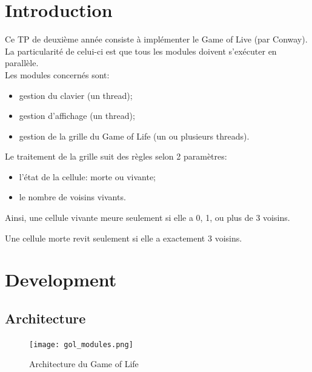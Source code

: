 \documentclass[11pt, a4paper]{article}
\begin{document}
\thispagestyle{empty}

\newpage

\section{Introduction}

Ce TP de deuxième année consiste à implémenter le Game of Live (par Conway).
La particularité de celui-ci est que tous les modules doivent s'exécuter en parallèle. \\

Les modules concernés sont:

\begin{itemize}
    \item gestion du clavier (un thread);
    \item gestion d'affichage (un thread);
    \item gestion de la grille du Game of Life (un ou plusieurs threads). \\
\end{itemize}

Le traitement de la grille suit des règles selon 2 paramètres:

\begin{itemize}
    \item l'état de la cellule: morte ou vivante;
    \item le nombre de voisins vivants. \\
\end{itemize}

Ainsi, une cellule vivante meure seulement si elle a 0, 1, ou plus de 3 voisins.

Une cellule morte revit seulement si elle a exactement 3 voisins.

\newpage

\section{Development}
\subsection{Architecture}

\begin{figure}[H]
    \begin{center}
        \texttt{[image: gol\_modules.png]}
    \end{center}
    \caption{Architecture du Game of Life}
    \label{Architecture du Game of Life}
\end{figure}
\end{document}

